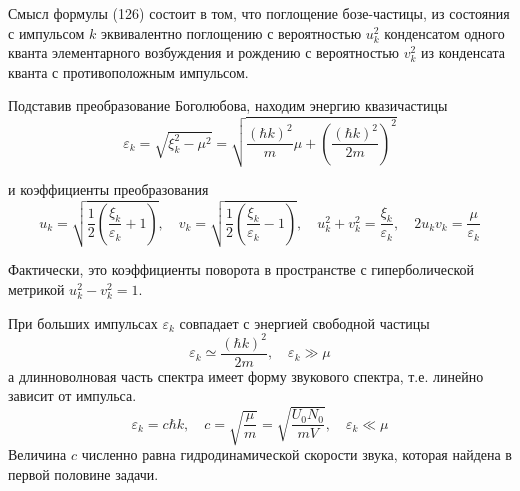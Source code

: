 \documentclass[a4paper,12pt]{article} %
\begin{document}
\begin{ttask}
Смысл формулы (126) состоит в том, что поглощение бозе-частицы, из состояния с импульсом $k$ 
эквивалентно поглощению с вероятностью $u_{k}^{2}$ конденсатом одного кванта элементарного возбуждения и 
рождению с вероятностью $v_{k}^{2}$ из конденсата кванта с противоположным импульсом. 


Подставив преобразование Боголюбова, находим энергию квазичастицы
$$
\varepsilon_{k}=\sqrt{\xi_{k}^{2}-\mu^{2}}=\sqrt{\frac{(\hbar k)^{2}}{m} \mu+\left(\frac{(\hbar k)^{2}}{2 m}\right)^{2}}
$$



и коэффициенты преобразования
$$
u_{k}=\sqrt{\frac{1}{2}\left(\frac{\xi_{k}}{\varepsilon_{k}}+1\right)}, 
\quad
v_{k}=\sqrt{\frac{1}{2}\left(\frac{\xi_{k}}{\varepsilon_{k}}-1\right)}, 
\quad
u_{k}^{2}+v_{k}^{2}=\frac{\xi_{k}}{\varepsilon_{k}}, 
\quad
2 u_{k} v_{k}=\frac{\mu}{\varepsilon_{k}}
$$




Фактически, это коэффициенты поворота в пространстве 
с гиперболической метрикой $u_{k}^{2}-v_{k}^{2}=1$.






При больших импульсах $\varepsilon_{k}$ совпадает с энергией свободной частицы
$$
\varepsilon_{k} \simeq \frac{(\hbar k)^{2}}{2 m}, 
\quad 
\varepsilon_{k} \gg \mu
$$
а длинноволновая часть спектра имеет форму звукового спектра, т.е. линейно зависит от импульса.
$$
\varepsilon_{k}=c \hbar k, \quad c=\sqrt{\frac{\mu}{m}}=\sqrt{\frac{U_{0} N_{0}}{m V}}, \quad \varepsilon_{k} \ll \mu
$$
Величина $c$ численно равна гидродинамической скорости звука, которая найдена в первой половине задачи. 














\end{ttask}
\end{document}

